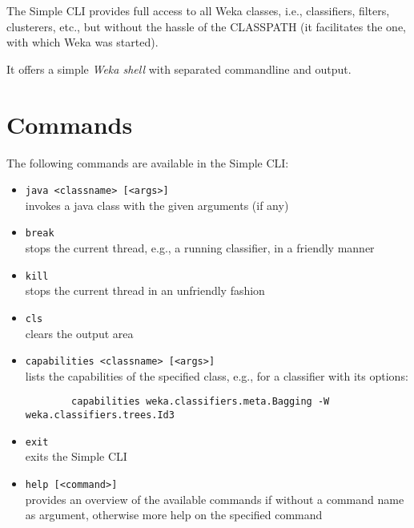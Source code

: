 %
%
%
%


The Simple CLI provides full access to all Weka classes, i.e., classifiers, filters, clusterers, etc., but without the hassle of the CLASSPATH (it facilitates the one, with which Weka was started).

It offers a simple \textit{Weka shell} with separated commandline and output.

\begin{center}
\end{center}


\section{Commands}
The following commands are available in the Simple CLI:
\begin{itemize}
	\item \texttt{java <classname> [<args>]} \\
		invokes a java class with the given arguments (if any)
	\item \texttt{break} \\
		stops the current thread, e.g., a running classifier, in a friendly manner
	\item \texttt{kill} \\
		stops the current thread in an unfriendly fashion
	\item \texttt{cls} \\
		clears the output area
	\item \texttt{capabilities <classname> [<args>]} \\
		lists the capabilities of the specified class, e.g., for a classifier
		with its options:
		{\small \begin{verbatim}
 		capabilities weka.classifiers.meta.Bagging -W weka.classifiers.trees.Id3
		\end{verbatim}}
	\item \texttt{exit} \\
		exits the Simple CLI
	\item \texttt{help [<command>]} \\
		provides an overview of the available commands if without a command name as argument, otherwise more help on the specified command
\end{itemize}


